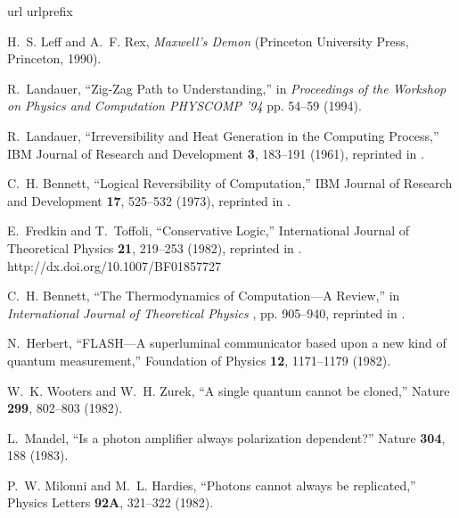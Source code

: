 \documentclass[pra,amsfonts,twocolumn]{revtex4}
\begin{document}
%
%


\begin{thebibliography}{10}
\newcommand{\enquote}[1]{``#1''}
\expandafter\ifx\csname url\endcsname\relax
  \def\url#1{{#1}}\fi
\expandafter\ifx\csname urlprefix\endcsname\relax\def\urlprefix{}\fi

H.~S. Leff and A.~F. Rex, {\em Maxwell's Demon\/} (Princeton University Press,
  Princeton, 1990).

R.~Landauer, \enquote{Zig-Zag Path to Understanding,} in {\em Proceedings of
  the Workshop on Physics and Computation PHYSCOMP '94\/}  pp. 54--59 (1994).

R.~Landauer, \enquote{Irreversibility and Heat Generation in the Computing
  Process,} IBM Journal of Research and Development {\bf 3}, 183--191 (1961),
  reprinted in \cite[pp. 188-196]{maxwell-demon}.

C.~H. Bennett, \enquote{Logical Reversibility of Computation,} IBM Journal of
  Research and Development {\bf 17}, 525--532 (1973), reprinted in \cite[pp.
  197-204]{maxwell-demon}.

E.~Fredkin and T.~Toffoli, \enquote{Conservative Logic,} International Journal
  of Theoretical Physics {\bf 21}, 219--253 (1982), reprinted in \cite[Part I,
  Chapter 3]{adama02}.
\newline http://dx.doi.org/10.1007/BF01857727

C.~H. Bennett, \enquote{The Thermodynamics of Computation---A Review,} in {\em
  International Journal of Theoretical Physics\/} \cite{maxwell-demon}, pp.
  905--940, reprinted in \cite[pp. 213-248]{maxwell-demon}.

N.~Herbert, \enquote{{FLASH}---A superluminal communicator based upon a new
  kind of quantum measurement,} Foundation of Physics {\bf 12}, 1171--1179
  (1982).

W.~K. Wooters and W.~H. Zurek, \enquote{A single quantum cannot be cloned,}
  Nature {\bf 299}, 802--803 (1982).

L.~Mandel, \enquote{Is a photon amplifier always polarization dependent?}
  Nature {\bf 304}, 188 (1983).

P.~W. Milonni and M.~L. Hardies, \enquote{Photons cannot always be replicated,}
  Physics Letters {\bf 92A}, 321--322 (1982).


\end{thebibliography}
\end{document}
